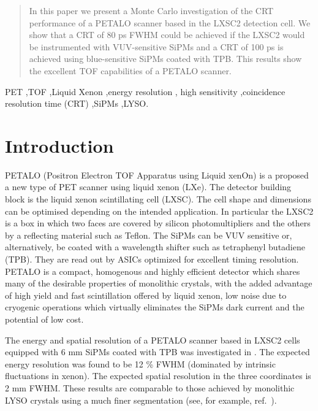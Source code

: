 \documentclass[review]{elsarticle}
\begin{document}
\begin{frontmatter}
\begin{abstract}
In this paper we present a Monte Carlo investigation of the CRT performance of a
PETALO scanner based in the LXSC2 detection cell. We show that a CRT of 80 ps FWHM could be achieved if the LXSC2 would be instrumented with VUV-sensitive SiPMs and a CRT of 100 ps is achieved using blue-sensitive SiPMs coated with TPB. This results show the excellent TOF capabilities of a PETALO scanner.   
 \end{abstract}

\begin{keyword}
PET \sep TOF \sep Liquid Xenon \sep energy resolution \sep
 high sensitivity \sep coincidence resolution time (CRT) \sep SiPMs \sep LYSO.
\end{keyword}

\end{frontmatter}



\section{Introduction}

PETALO (Positron Electron TOF Apparatus using Liquid xenOn) is a proposed a new type of PET scanner using liquid xenon \cite{Petalo2015} (LXe). The detector building block is the liquid xenon scintillating cell (LXSC). The cell shape and dimensions can be optimised depending on the intended application. In particular the LXSC2 is a box in which two faces are covered by silicon photomultipliers and the others by a reflecting material such as Teflon. The SiPMs can be VUV sensitive or, alternatively, be coated with a wavelength shifter such as tetraphenyl butadiene (TPB).  They are read out by ASICs optimized for excellent timing resolution. PETALO is a compact, homogenous and highly efficient detector which shares many of the desirable properties of monolithic crystals, with the added advantage of high yield and fast scintillation offered by liquid xenon, low noise due to cryogenic operations which virtually eliminates the SiPMs dark current and the potential of low cost. 

The energy and spatial resolution of a PETALO scanner based in LXSC2 cells equipped with 6 mm SiPMs coated with TPB was investigated in \cite{Petalo2015}. The expected energy resolution was found to be 12 \% FWHM (dominated by intrinsic fluctuations in xenon). The expected spatial resolution in the three coordinates is 2 mm FWHM. These results are  comparable to those achieved by monolithic LYSO crystals using a much finer segmentation 
(see, for example, ref.~\cite{VanDamm2011}). 
\end{document}
